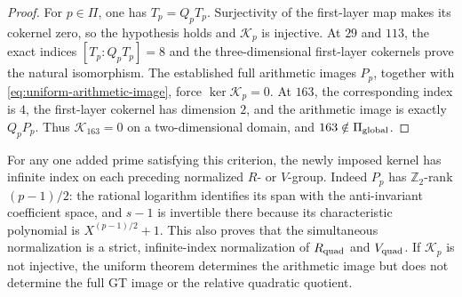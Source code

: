 \begin{proof}
For \(p\in\Pi\), one has \(T_p=Q_pT_p\). Surjectivity of
the first-layer map makes its cokernel zero, so the
hypothesis holds and \(\mathscr K_p\) is injective.
At \(29\) and \(113\), the exact indices
\([T_p:Q_pT_p]=8\) and the three-dimensional first-layer
cokernels prove the natural isomorphism. The established
full arithmetic images \(P_p\), together with
\eqref{eq:uniform-arithmetic-image}, force
\(\ker\mathscr K_p=0\).
At \(163\), the corresponding index is \(4\), the
first-layer cokernel has dimension \(2\), and the
arithmetic image is exactly \(Q_pP_p\). Thus
\(\mathscr K_{163}=0\) on a two-dimensional domain,
and \(163\notin\Pi_{\rm global}\).
\end{proof}

For any one added prime satisfying this criterion, the newly
imposed kernel has infinite index on each preceding normalized
\(R\)- or \(V\)-group. Indeed \(P_p\) has
\(\mathbb Z_2\)-rank \((p-1)/2\): the rational logarithm
identifies its span with the anti-invariant coefficient space,
and \(s-1\) is invertible there because its characteristic
polynomial is \(X^{(p-1)/2}+1\). This also proves that the
simultaneous normalization is a strict, infinite-index
normalization of \(R_{\rm quad}\) and \(V_{\rm quad}\).
If \(\mathscr K_p\) is not injective, the uniform theorem
determines the arithmetic image but does not determine the
full GT image or the relative quadratic quotient.
